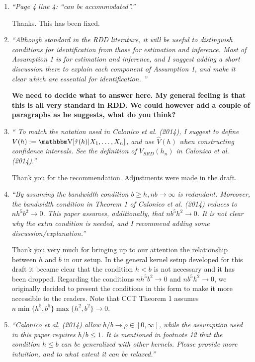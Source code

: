 \documentclass[12pt,fleqn]{article}
\begin{document}
\begin{enumerate}

 \item  \textit{``Page 4 line 4: ``can be accommodated''.''}

 Thanks. This has been fixed.

\item \textit{``Although standard in the RDD literature, it will be useful to distinguish conditions for identification from those for estimation and inference. Most of Assumption 1 is for
estimation and inference, and I suggest adding a short discussion there to explain each component of Assumption 1, and make it clear which are essential for identification. ''}

   \textbf{We need to decide what to answer here. My general feeling is that this is all very standard in RDD. We could however add a couple of paragraphs as he suggests, what do you think?}

\item \textit{`` To match the notation used in Calonico et al. (2014), I suggest to define $V(h) :=\V[\hat{\tau}(h)|X_{1}, \dots ,X_{n}]$, and use $\hat{V}(h)$ when constructing confidence intervals. See the definition of $V_{SRD}(h_{n})$ in Calonico et al. (2014).''}

 Thank you for the recommendation. Adjustments were made in the draft.

\item \textit{``By assuming the bandwidth condition $b \geq h, nb \rightarrow \infty$ is redundant. Moreover, the bandwidth condition in Theorem 1 of Calonico et al. (2014) reduces to $nh^{5}b^{2} \rightarrow 0$. This paper assumes, additionally, that $nb^{5}h^{2} \rightarrow 0$. It is not clear why the extra condition is needed, and I recommend adding some discussion/explanation.''}

  Thank you very much for bringing up to our attention the relationship between $h$ and $b$ in our setup. In the general kernel setup developed for this draft it became clear that the condition $h<b$ is not necessary and it has been dropped. Regarding the conditions $nh^{5}b^{2} \rightarrow 0$ and $nb^{5}h^{2} \rightarrow 0$, we originally decided to present the conditions in this form to make it more accessible to the readers. Note that CCT Theorem 1 assumes $n \min\{h^{5},b^{5}\}\max\{h^{2}, b^{2}\} \rightarrow 0$.


\item \textit{``Calonico et al. (2014) allow $h/b \rightarrow \rho \in [0,\infty]$, while the assumption used in this paper requires $h/b \leq 1$. It is mentioned in footnote 12 that the condition $h \leq b$ can be generalized with other kernels. Please provide more intuition, and to what extent it can be relaxed.''}


\end{enumerate}
\end{document}
